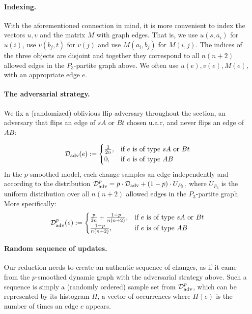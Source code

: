 \documentclass[letter,11pt]{article}
\newcommand{\advdist}{\mathcal{D}_\textnormal{adv}}
\begin{document}
\paragraph{Indexing.} With the aforementioned connection in mind, it is more convenient to index the vectors $u, v$ and the matrix $M$ with graph edges. 
That is, we use $u(s,a_i)$ for $u(i)$, use $v(b_j,t)$ for $v(j)$ and use $M(a_i, b_j)$ for $M(i,j)$. 
The indices of the three objects are disjoint and together they correspond to all $n(n+2)$ allowed edges in the $P_3$-partite graph above. 
We often use $u(e), v(e), M(e)$, with an appropriate edge $e$.

\paragraph{The adversarial strategy.}
We fix a (randomized) oblivious flip  adversary throughout the section, an adversary that flips an edge of $sA$ or $Bt$ chosen u.a.r, and never flips an edge of $AB$:

\[
\begin{aligned}
        \advdist (e):=
            \begin{cases}
        		\frac{1}{2n} , & \text{if $e$ is of type $sA$ or $Bt$}\\
                0, & \text{if $e$ is of type $AB$}
		  \end{cases}
\end{aligned}
\]
In the $p$-smoothed model, each change samples an edge independently and according to the distribution $\advdist^p = p\cdot \advdist + (1-p)\cdot U_{P_3}$, where $U_{P_3}$ is the uniform distribution over all $n(n+2)$ allowed edges in the $P_3$-partite graph. 
More specifically:
\[
\begin{aligned}
        \advdist^p (e):=
            \begin{cases}
        		\frac{p}{2n} + \frac{1-p}{n(n+2)}, & \text{if $e$ is of type $sA$ or $Bt$}\\
                \frac{1-p}{n(n+2)}, & \text{if $e$ is of type $AB$}
		  \end{cases}
\end{aligned}
\]


\paragraph{Random sequence of updates.}
Our reduction needs to create an authentic sequence of changes, as if it came from the $p$-smoothed dynamic graph with the adversarial strategy above. 
Such a sequence is simply a (randomly ordered) sample set from $\advdist^p$, which can be represented by its histogram $H$, a vector of occurrences where $H(e)$ is the number of times an edge $e$ appears.
\end{document}
